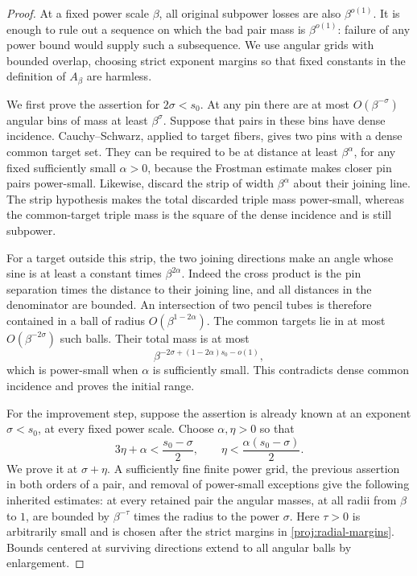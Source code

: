 \begin{proof}
At a fixed power scale $\beta$, all original subpower losses are also
$\beta^{o(1)}$. It is enough to rule out a sequence on which the bad
pair mass is $\beta^{o(1)}$: failure of any power bound would supply
such a subsequence. We use angular grids with bounded overlap, choosing
strict exponent margins so that fixed constants in the definition of
$A_\beta$ are harmless.

We first prove the assertion for $2\sigma<s_0$. At any pin there are
at most $O(\beta^{-\sigma})$ angular bins of mass at least
$\beta^\sigma$. Suppose that pairs in these bins have dense incidence.
Cauchy--Schwarz, applied to target fibers, gives two pins with a dense
common target set. They can be required to be at distance at least
$\beta^\alpha$, for any fixed sufficiently small $\alpha>0$, because
the Frostman estimate makes closer pin pairs power-small. Likewise,
discard the strip of width $\beta^\alpha$ about their joining line.
The strip hypothesis makes the total discarded triple mass
power-small, whereas the common-target triple mass is the square of
the dense incidence and is still subpower.

For a target outside this strip, the two joining directions make an
angle whose sine is at least a constant times $\beta^{2\alpha}$.
Indeed the cross product is the pin separation times the distance to
their joining line, and all distances in the denominator are bounded.
An intersection of two pencil tubes is therefore contained in a ball
of radius $O(\beta^{1-2\alpha})$. The common targets lie in at most
$O(\beta^{-2\sigma})$ such balls. Their total mass is at most
\[
 \beta^{-2\sigma+(1-2\alpha)s_0-o(1)},
\]
which is power-small when $\alpha$ is sufficiently small. This
contradicts dense common incidence and proves the initial range.

For the improvement step, suppose the assertion is already known at
an exponent $\sigma<s_0$, at every fixed power scale. Choose
$\alpha,\eta>0$ so that
\begin{equation}
 3\eta+\alpha<\frac{s_0-\sigma}{2},
 \qquad
 \eta<\frac{\alpha(s_0-\sigma)}2.
 \label{proj:radial-margins}
\end{equation}
We prove it at $\sigma+\eta$. A sufficiently fine finite power grid,
the previous assertion in both orders of a pair, and removal of
power-small exceptions give the following inherited estimates: at
every retained pair the angular masses, at all radii from $\beta$ to
$1$, are bounded by $\beta^{-\tau}$ times the radius to the power
$\sigma$. Here $\tau>0$ is arbitrarily small and is chosen after the
strict margins in \eqref{proj:radial-margins}. Bounds centered at
surviving directions extend to all angular balls by enlargement.


\end{proof}

